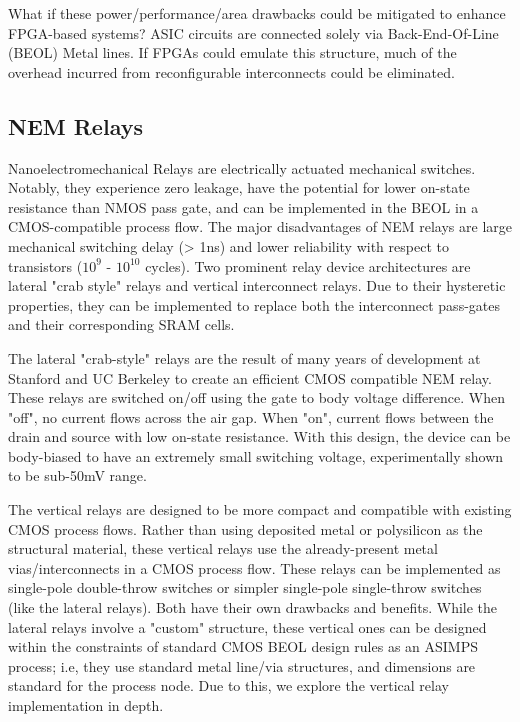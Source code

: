 \documentclass[twoside,twocolumn]{article}
\begin{document}
What if these power/performance/area drawbacks could be mitigated to enhance FPGA-based systems? ASIC circuits are connected solely via Back-End-Of-Line (BEOL) Metal lines. If FPGAs could emulate this structure, much of the overhead incurred from reconfigurable interconnects could be eliminated.

\subsection{NEM Relays}

Nanoelectromechanical Relays are electrically actuated mechanical switches. Notably, they experience zero leakage, have the potential for lower on-state resistance than NMOS pass gate, and can be implemented in the BEOL in a CMOS-compatible process flow\cite{LIU}. The major disadvantages of NEM relays are large mechanical switching delay (> 1ns)\cite{chen_integrated_2008} and lower reliability with respect to transistors ($10^9$ - $10^{10}$ cycles). Two prominent relay device architectures are lateral "crab style" relays and vertical interconnect relays. Due to their hysteretic properties, they can be implemented to replace both the interconnect pass-gates and their corresponding SRAM cells.

The lateral "crab-style" relays are the result of many years of development at Stanford and UC Berkeley to create an efficient CMOS compatible NEM relay\cite{LIU}. These relays are switched on/off using the gate to body voltage difference. When "off", no current flows across the air gap. When "on", current flows between the drain and source with low on-state resistance. With this design, the device can be body-biased to have an extremely small switching voltage, experimentally shown to be sub-50mV range.

The vertical relays are designed to be more compact and compatible with existing CMOS process flows. Rather than using deposited metal or polysilicon as the structural material, these vertical relays use the already-present metal vias/interconnects in a CMOS process flow\cite{SIKDER}. These relays can be implemented as single-pole double-throw switches or simpler single-pole single-throw switches \cite{OLDSIKDER} (like the lateral relays). Both have their own drawbacks and benefits. While the lateral relays involve a "custom" structure, these vertical ones can be designed within the constraints of standard CMOS BEOL design rules as an ASIMPS process; i.e, they use standard metal line/via structures, and dimensions are standard for the process node. Due to this, we explore the vertical relay implementation in depth.
\end{document}
